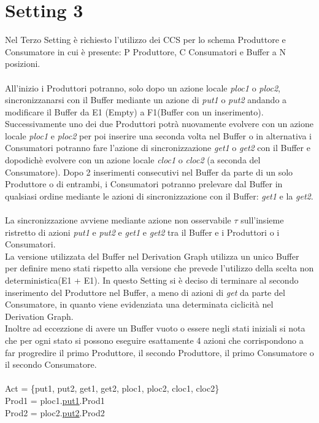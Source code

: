 \documentclass{article}
\begin{document}
\section{Setting 3}
Nel Terzo Setting è richiesto l'utilizzo dei CCS per lo schema Produttore e Consumatore in cui è presente: P Produttore, C Consumatori e Buffer a N posizioni.
\\\\All'inizio i Produttori potranno, solo dopo un azione locale \textit{ploc1} o \textit{ploc2}, sincronizzanarsi con il Buffer mediante un azione di \textit{put1} o \textit{put2} andando a modificare il Buffer da E1 (Empty) a F1(Buffer con un inserimento). Successivamente uno dei due Produttori potrà nuovamente evolvere con un azione locale \textit{ploc1} e \textit{ploc2} per poi inserire una seconda volta nel Buffer o in alternativa i Consumatori potranno fare l'azione di sincronizzazione \textit{get1} o \textit{get2} con il Buffer e dopodichè evolvere con un azione locale \textit{cloc1} o \textit{cloc2} (a seconda del Consumatore). Dopo 2 inserimenti consecutivi nel Buffer da parte di un solo Produttore o di entrambi, i Consumatori potranno prelevare dal Buffer in qualsiasi ordine mediante le azioni di sincronizzazione con il Buffer: \textit{get1} e la \textit{get2}.
\\\\La sincronizzazione avviene mediante azione non osservabile $\tau$ sull'insieme ristretto di azioni \textit{put1} e \textit{put2} e \textit{get1} e \textit{get2} tra il Buffer e i Produttori o i Consumatori.
\\La versione utilizzata del Buffer nel Derivation Graph utilizza un unico Buffer per definire meno stati rispetto alla versione che prevede l'utilizzo della scelta non deterministica(E1 + E1).
In questo Setting si è deciso di terminare al secondo inserimento del Produttore nel Buffer, a meno di azioni di \textit{get} da parte del Consumatore, in quanto viene evidenziata una determinata ciclicità nel Derivation Graph.
\\Inoltre ad eccezzione di avere un Buffer vuoto o essere negli stati iniziali si nota che per ogni stato si possono eseguire esattamente 4 azioni che corrispondono a far progredire il primo Produttore, il secondo Produttore, il primo Consumatore o il secondo Consumatore.
\\\\Act = \{put1, put2, get1, get2, ploc1, ploc2, cloc1, cloc2\}
\\Prod1 = ploc1.\underline{put1}.Prod1
\\Prod2 = ploc2.\underline{put2}.Prod2
\end{document}
